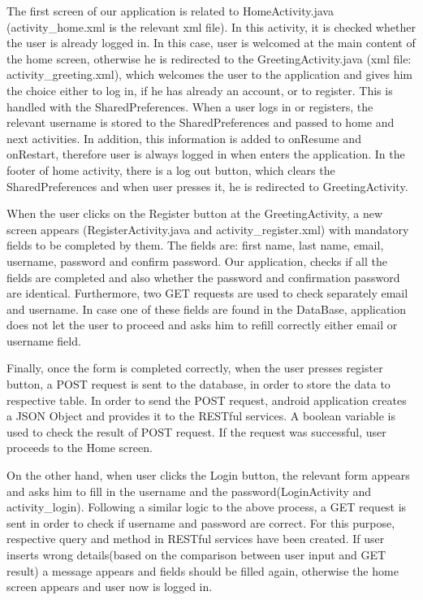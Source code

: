 \documentclass[12pt]{article}
\begin{document}
	The first screen of our application is related to HomeActivity.java (activity\_home.xml is the relevant xml file). In this activity, it is checked whether the user is already logged in. In this case, user is welcomed at the main content of the home screen, otherwise he is redirected to the GreetingActivity.java (xml file: activity\_greeting.xml), which welcomes the user to the application and gives him the choice either to log in, if he has already an account, or to register. This is handled with the SharedPreferences. When a user logs in or registers, the relevant username is stored to the SharedPreferences and passed to home and next activities. In addition, this information is added to onResume  and onRestart, therefore user is always logged in when enters the application. In the footer of home activity, there is a log out button, which clears the SharedPreferences and when user presses it, he is redirected to GreetingActivity.
	
	When the user clicks on the Register button at the GreetingActivity, a new screen appears (RegisterActivity.java and activity\_register.xml) with mandatory fields to be completed by them. The fields are: first name, last name, email, username, password and confirm password. Our application, checks if all the fields are completed and also whether the password and confirmation password are identical. Furthermore, two GET requests are used to check separately email and username. In case one of these fields are found in the DataBase, application does not let the user to proceed and asks him to refill correctly either email or username field. 
	
	Finally, once the form is completed correctly, when the user presses register button, a POST request is sent to the database, in order to store the data to respective table. In order to send the POST request, android application creates a JSON Object and provides it to the RESTful services. A boolean variable is used to check the result of POST request. If the request was successful, user proceeds to the Home screen.
	
	On the other hand, when user clicks the Login button, the relevant form appears and asks him to fill in the username and the password(LoginActivity and activity\_login). Following a similar logic to the above process, a GET request is sent in order to check if username and password are correct. For this purpose, respective query and method in RESTful services have been created. If user inserts wrong details(based on the comparison between user input and GET result) a message appears and fields should be filled again, otherwise the home screen appears and user now is logged in.
	
\end{document}
